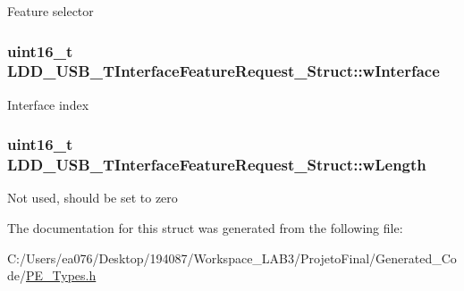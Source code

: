 Feature selector \hypertarget{struct_l_d_d___u_s_b___t_interface_feature_request___struct_afc1da433b4a02f8c6a6ed6ce8b3065da}{
\subsubsection[{w\-Interface}]{\setlength{\rightskip}{0pt plus 5cm}uint16\-\_\-t L\-D\-D\-\_\-\-U\-S\-B\-\_\-\-T\-Interface\-Feature\-Request\-\_\-\-Struct\-::w\-Interface}}\label{struct_l_d_d___u_s_b___t_interface_feature_request___struct_afc1da433b4a02f8c6a6ed6ce8b3065da}
Interface index \hypertarget{struct_l_d_d___u_s_b___t_interface_feature_request___struct_a5f54f1e83024342d9d63aad374a117ba}{
\subsubsection[{w\-Length}]{\setlength{\rightskip}{0pt plus 5cm}uint16\-\_\-t L\-D\-D\-\_\-\-U\-S\-B\-\_\-\-T\-Interface\-Feature\-Request\-\_\-\-Struct\-::w\-Length}}\label{struct_l_d_d___u_s_b___t_interface_feature_request___struct_a5f54f1e83024342d9d63aad374a117ba}
Not used, should be set to zero 

The documentation for this struct was generated from the following file\-:\begin{DoxyCompactItemize}
\item 
C\-:/\-Users/ea076/\-Desktop/194087/\-Workspace\-\_\-\-L\-A\-B3/\-Projeto\-Final/\-Generated\-\_\-\-Code/\hyperlink{_p_e___types_8h}{P\-E\-\_\-\-Types.\-h}\end{DoxyCompactItemize}
